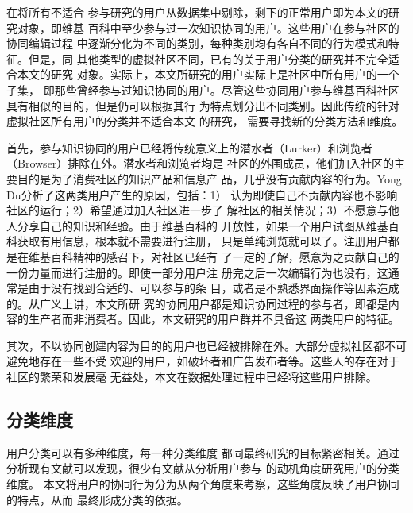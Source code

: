 在将所有不适合
参与研究的用户从数据集中剔除，剩下的正常用户即为本文的研究对象，即维基
百科中至少参与过一次知识协同的用户。这些用户在参与社区的协同编辑过程
中逐渐分化为不同的类别，每种类别均有各自不同的行为模式和特征。但是，同
其他类型的虚拟社区不同，已有的关于用户分类的研究并不完全适合本文的研究
对象。实际上，本文所研究的用户实际上是社区中所有用户的一个子集，
即那些曾经参与过知识协同的用户。尽管这些协同用户参与维基百科社区具有相似的目的，但是仍可以根据其行
为特点划分出不同类别。因此传统的针对虚拟社区所有用户的分类并不适合本文
的研究，
需要寻找新的分类方法和维度。

首先，参与知识协同的用户已经将传统意义上的潜水者（Lurker）和浏览者
（Browser）排除在外。潜水者和浏览者均是
社区的外围成员，他们加入社区的主要目的是为了消费社区的知识产品和信息产
品，几乎没有贡献内容的行为。Yong Du分析了这两类用户产生的原因，包括：1）
认为即使自己不贡献内容也不影响社区的运行；2）希望通过加入社区进一步了
解社区的相关情况；3）不愿意与他人分享自己的知识和经验\cite{4052703}。由于维基百科的
开放性，如果一个用户试图从维基百科获取有用信息，根本就不需要进行注册，
只是单纯浏览就可以了。注册用户都是在维基百科精神的感召下，对社区已经有
了一定的了解，愿意为之贡献自己的一份力量而进行注册的。即使一部分用户注
册完之后一次编辑行为也没有，这通常是由于没有找到合适的、可以参与的条
目，或者是不熟悉界面操作等因素造成的。从广义上讲，本文所研
究的协同用户都是知识协同过程的参与者，即都是内容的生产者而非消费者。因此，本文研究的用户群并不具备这
两类用户的特征。

其次，不以协同创建内容为目的的用户也已经被排除在外。大部分虚拟社区都不可避免地存在一些不受
欢迎的用户，如破坏者和广告发布者等。这些人的存在对于社区的繁荣和发展毫
无益处，本文在数据处理过程中已经将这些用户排除。



\subsection{分类维度}
\label{sec:dimension}
用户分类可以有多种维度，每一种分类维度
都同最终研究的目标紧密相关。通过分析现有文献可以发现，很少有文献从分析用户参与
的动机角度研究用户的分类维度。
本文将用户的协同行为分为从两个角度来考察，这些角度反映了用户协同的特点，从而
最终形成分类的依据。

